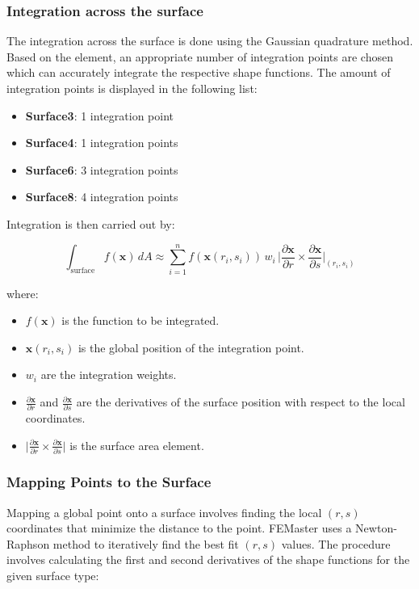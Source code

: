 \newpage

\subsubsection{Integration across the surface}
The integration across the surface is done using the Gaussian quadrature method.
Based on the element, an appropriate number of integration points are chosen which can accurately integrate the respective shape functions.
The amount of integration points is displayed in the following list:

\begin{itemize}
    \item \textbf{Surface3}: 1 integration point
    \item \textbf{Surface4}: 1 integration points
    \item \textbf{Surface6}: 3 integration points
    \item \textbf{Surface8}: 4 integration points
\end{itemize}

Integration is then carried out by:

\[
    \int_{\text{surface}} f(\mathbf{x}) \, dA \approx \sum_{i=1}^{n} f(\mathbf{x}(r_i, s_i)) \, w_i \, \bigg| \frac{\partial \mathbf{x}}{\partial r} \times \frac{\partial \mathbf{x}}{\partial s} \bigg|_{(r_i, s_i)}
\]

where:
\begin{itemize}
    \item \( f(\mathbf{x}) \) is the function to be integrated.
    \item \( \mathbf{x}(r_i, s_i) \) is the global position of the integration point.
    \item \( w_i \) are the integration weights.
    \item \( \frac{\partial \mathbf{x}}{\partial r} \) and \( \frac{\partial \mathbf{x}}{\partial s} \) are the derivatives of the surface position with respect to the local coordinates.
    \item \( \bigg| \frac{\partial \mathbf{x}}{\partial r} \times \frac{\partial \mathbf{x}}{\partial s} \bigg| \) is the surface area element.
\end{itemize}

\subsubsection{Mapping Points to the Surface}
Mapping a global point onto a surface involves finding the local $(r, s)$ coordinates that minimize the distance to the point. FEMaster uses a Newton-Raphson method to iteratively find the best fit $(r, s)$ values. The procedure involves calculating the first and second derivatives of the shape functions for the given surface type:

